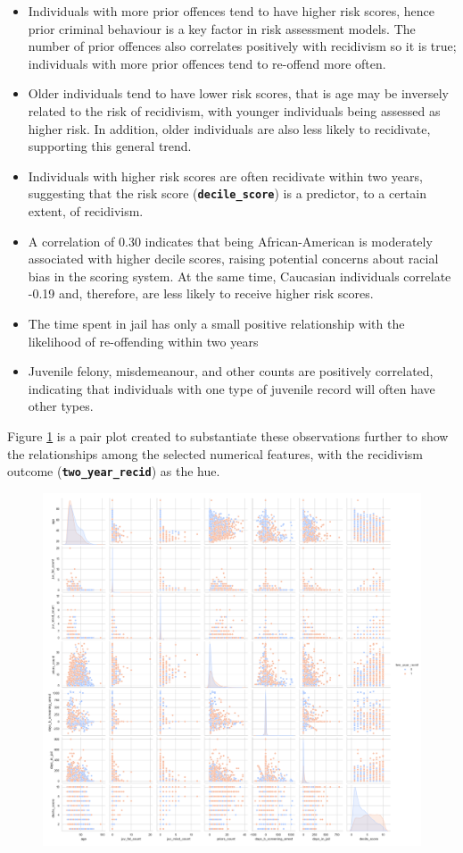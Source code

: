 \begin{itemize}
	\item Individuals with more prior offences tend to have higher risk scores, hence prior criminal behaviour is a key factor in risk assessment models. The number of prior offences also correlates positively with recidivism so it is true; individuals with more prior offences tend to re-offend more often.
	
	\item Older individuals tend to have lower risk scores, that is age may be inversely related to the risk of recidivism, with younger individuals being assessed as higher risk. In addition, older individuals are also less likely to recidivate, supporting this general trend.
	
	\item Individuals with higher risk scores are often recidivate within two years, suggesting that the risk score (\textbf{\texttt{decile\_score}}) is a predictor, to a certain extent, of recidivism.
	
	\item A correlation of 0.30 indicates that being African-American is moderately associated with higher decile scores, raising potential concerns about racial bias in the scoring system. At the same time, Caucasian individuals correlate -0.19 and, therefore, are less likely to receive higher risk scores.
	
	\item The time spent in jail has only a small positive relationship with the likelihood of re-offending within two years
	
	\item  Juvenile felony, misdemeanour, and other counts are positively correlated, indicating that individuals with one type of juvenile record will often have other types.
\end{itemize}

Figure \ref{fig:pairplot} is a pair plot created to substantiate these observations further to show the relationships among the selected numerical features, with the recidivism outcome (\textbf{\texttt{two\_year\_recid}}) as the hue.

\begin{figure}
	\centering
	\includegraphics[width=0.7\linewidth]{img/pair_plot}
	\caption{}
	\label{fig:pairplot}
\end{figure}


